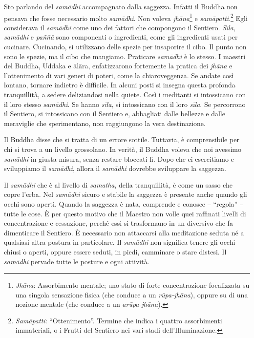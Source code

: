Sto parlando del \emph{samādhi} accompagnato dalla saggezza. Infatti il
Buddha non pensava che fosse necessario molto \emph{samādhi}. Non voleva
\emph{jhāna}\footnote{%
  \emph{Jhāna}: Assorbimento mentale; uno stato di
  forte concentrazione focalizzata su una singola sensazione fisica (che
  conduce a un \emph{rūpa-jhāna}), oppure su di una nozione mentale (che
  conduce a un \emph{arūpa-jhāna}).}
e \emph{samāpatti}.\footnote{%
  \emph{Samāpatti}: ``Ottenimento''. Termine che indica i quattro assorbimenti
  immateriali, o i Frutti del Sentiero nei vari stadi
  dell'Illuminazione.}
Egli considerava il \emph{samādhi} come uno dei
fattori che compongono il Sentiero. \emph{Sīla}, \emph{samādhi} e
\emph{paññā} sono componenti o ingredienti, come gli ingredienti usati
per cucinare. Cucinando, si utilizzano delle spezie per insaporire il
cibo. Il punto non sono le spezie, ma il cibo che mangiamo. Praticare
\emph{samādhi} è lo stesso. I maestri del Buddha, Uddaka e ālāra,
enfatizzarono fortemente la pratica dei \emph{jhāna} e l'ottenimento di
vari generi di poteri, come la chiaroveggenza. Se andate così lontano,
tornare indietro è difficile. In alcuni posti si insegna questa profonda
tranquillità, a sedere deliziandosi nella quiete. Così i meditanti si
intossicano con il loro stesso \emph{samādhi}. Se hanno \emph{sīla}, si
intossicano con il loro \emph{sīla}. Se percorrono il Sentiero, si
intossicano con il Sentiero e, abbagliati dalle bellezze e dalle
meraviglie che sperimentano, non raggiungono la vera destinazione.

Il Buddha disse che si tratta di un errore sottile. Tuttavia, è
comprensibile per chi si trova a un livello grossolano. In verità, il
Buddha voleva che noi avessimo \emph{samādhi} in giusta misura, senza
restare bloccati lì. Dopo che ci esercitiamo e sviluppiamo il
\emph{samādhi}, allora il \emph{samādhi} dovrebbe sviluppare la
saggezza.

Il \emph{samādhi} che è al livello di \emph{samatha}, della
tranquillità, è come un sasso che copre l'erba. Nel \emph{samādhi}
sicuro e stabile la saggezza è presente anche quando gli occhi sono
aperti. Quando la saggezza è nata, comprende e conosce -- ``regola'' --
tutte le cose. È per questo motivo che il Maestro non volle quei
raffinati livelli di concentrazione e cessazione, perché essi si
trasformano in un diversivo che fa dimenticare il Sentiero. È necessario
non attaccarsi alla meditazione seduta né a qualsiasi altra postura in
particolare. Il \emph{samādhi} non significa tenere gli occhi chiusi o
aperti, oppure essere seduti, in piedi, camminare o stare distesi. Il
\emph{samādhi} pervade tutte le posture e ogni attività.

